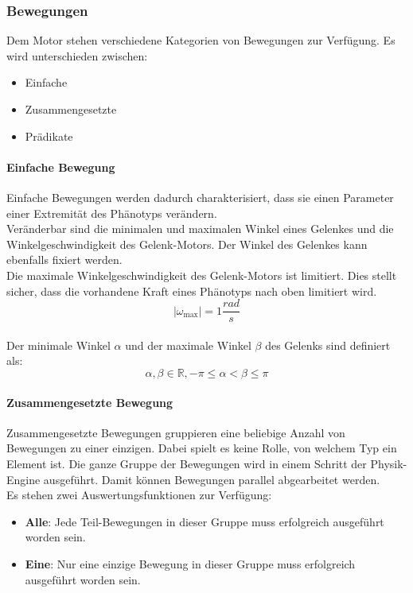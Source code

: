       \subsubsection{Bewegungen\label{subsub:EngineMovements}}

        Dem Motor stehen verschiedene Kategorien von Bewegungen zur Verfügung.
        Es wird unterschieden zwischen:

        \begin{itemize}
          \item Einfache
          \item Zusammengesetzte
          \item Prädikate
        \end{itemize}

        \paragraph{Einfache Bewegung\label{EngineMovementsSimple}}

          Einfache Bewegungen werden dadurch charakterisiert,
          dass sie einen Parameter einer Extremität des Phänotyps verändern.
          \\
          Veränderbar sind die minimalen und maximalen Winkel eines Gelenkes und die Winkelgeschwindigkeit des
          Gelenk-Motors. Der Winkel des Gelenkes kann ebenfalls fixiert werden.
          \\
          Die maximale Winkelgeschwindigkeit des Gelenk-Motors ist limitiert.
          Dies stellt sicher, dass die vorhandene Kraft eines Phänotyps nach oben limitiert wird.
          \[ {\lvert} \omega_{\max} {\rvert} = 1\frac{rad}{s}\]
          \\
          Der minimale Winkel \(\alpha \) und der maximale Winkel \(\beta \) des Gelenks sind definiert als:
          \[ \alpha, \beta \in \mathbb{R}, -\pi \leq \alpha < \beta \leq \pi \]

        \paragraph{Zusammengesetzte Bewegung\label{EngineMovementsCompound}}

          Zusammengesetzte Bewegungen gruppieren eine beliebige Anzahl von Bewegungen zu einer einzigen.
          Dabei spielt es keine Rolle, von welchem Typ ein Element ist.
          Die ganze Gruppe der Bewegungen wird in einem Schritt der Physik-Engine ausgeführt.
          Damit können Bewegungen parallel abgearbeitet werden.
          \\
          Es stehen zwei Auswertungsfunktionen zur Verfügung:
          \begin{itemize}
            \item \textbf{Alle}: Jede Teil-Bewegungen in dieser Gruppe muss erfolgreich ausgeführt worden sein.
            \item \textbf{Eine}: Nur eine einzige Bewegung in dieser Gruppe muss erfolgreich ausgeführt worden sein.
          \end{itemize}

